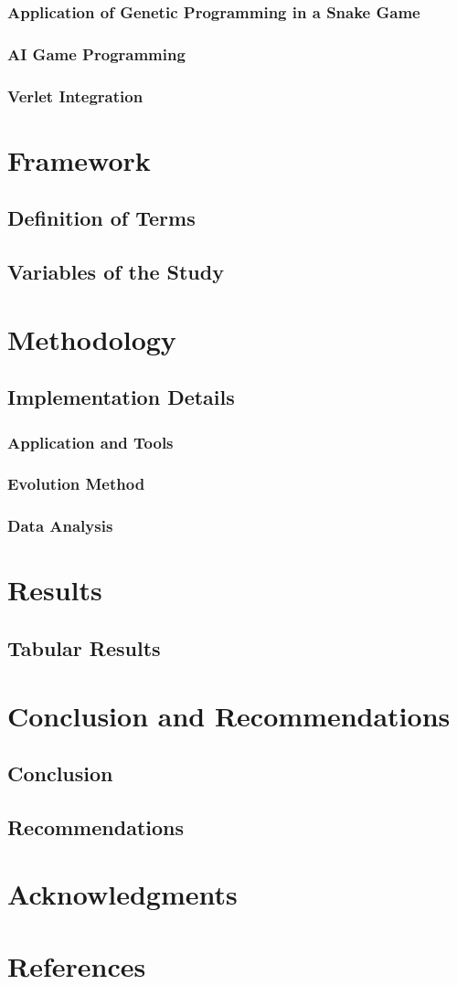 \documentclass{acm_proc_article-sp}
\begin{document}
\subsubsection{Application of Genetic Programming in a Snake Game}
\subsubsection{AI Game Programming}
\subsubsection{Verlet Integration}
\section{Framework}
\subsection{Definition of Terms}
\subsection{Variables of the Study}
\section{Methodology}
\subsection{Implementation Details}
\subsubsection{Application and Tools}
\subsubsection{Evolution Method}
\subsubsection{Data Analysis}
\section{Results}
\subsection{Tabular Results} 
\section{Conclusion and Recommendations}
\subsection{Conclusion}
\subsection{Recommendations}
\section{Acknowledgments}
\section{References}

\balancecolumns
\end{document}
